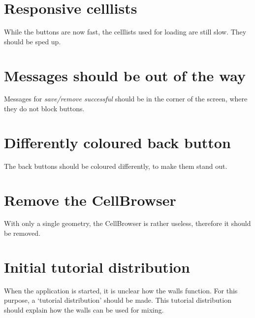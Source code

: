 \section*{Responsive celllists}
While the buttons are now fast, the celllists used for loading are still slow. They should be sped up.

\section*{Messages should be out of the way}
Messages for \emph{save/remove successful} should be in the corner of the screen, where they do not block buttons.

\section*{Differently coloured back button}
The back buttons should be coloured differently, to make them stand out.

\section*{Remove the CellBrowser}
With only a single geometry, the CellBrowser is rather useless, therefore it should be removed.

\section*{Initial tutorial distribution}
When the application is started, it is unclear how the walls function. For this purpose, a `tutorial distribution' should be made. This tutorial distribution should explain how the walls can be used for mixing.